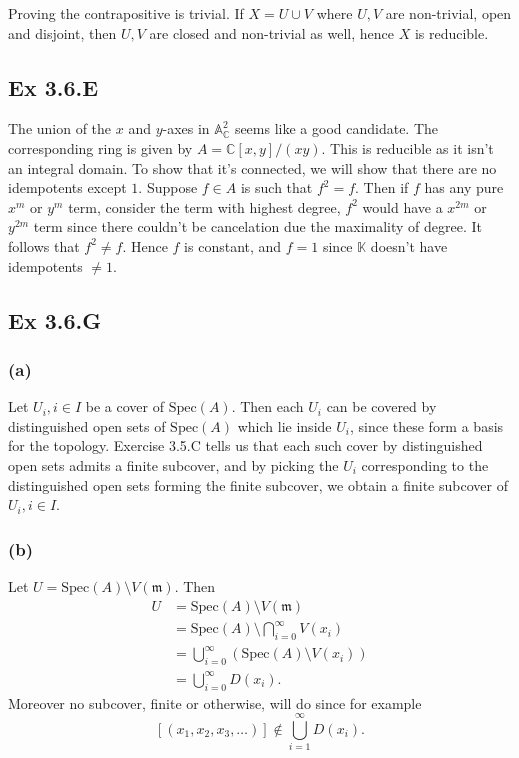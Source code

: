 \documentclass{article}
\theoremstyle{definition}
\newcommand{\C}{\mathbb{C}}
\newcommand{\K}{\mathbb{K}}
\newcommand{\A}{\mathbb{A}}
\newcommand{\Spec}{\text{Spec}}
\begin{document}
Proving the contrapositive is trivial. If $X = U \cup V$ where $U, V$ are
non-trivial, open and disjoint, then $U, V$ are closed and non-trivial as well,
hence $X$ is reducible.

\subsection*{Ex 3.6.E}

The union of the $x$ and $y$-axes in $\A^2_{\C}$ seems like a good candidate.
The corresponding ring is given by $A = \C[x, y]/(xy)$. This is reducible as it
isn't an integral domain. To show that it's connected, we will show that there
are no idempotents except $1$. Suppose $f \in A$ is such that $f^2 = f$. Then
if $f$ has any pure $x^m$ or $y^m$ term, consider the term with highest degree,
$f^2$ would have a $x^{2m}$ or $y^{2m}$ term since there couldn't be
cancelation due the maximality of degree. It follows that $f^2 \not = f$. Hence
$f$ is constant, and $f = 1$ since $\K$ doesn't have idempotents $\not = 1$.

\subsection*{Ex 3.6.G}

\subsubsection*{(a)}

Let $U_i, i \in I$ be a cover of $\Spec(A)$. Then each $U_i$ can be covered by
distinguished open sets of $\Spec(A)$ which lie inside $U_i$, since these form
a basis for the topology. Exercise 3.5.C tells us that each such cover by
distinguished open sets admits a finite subcover, and by picking the $U_i$
corresponding to the distinguished open sets forming the finite subcover, we
obtain a finite subcover of $U_i, i \in I$.

\subsubsection*{(b)}

Let $U = \Spec(A) \setminus V(\mathfrak{m})$. Then
\begin{align*}
	U
	 & =
	\Spec(A) \setminus V(\mathfrak{m})                              \\
	 & =
	\Spec(A) \setminus \bigcap_{i = 0}^{\infty} V(x_i)              \\
	 & =
	\bigcup_{i = 0}^{\infty} \left(\Spec(A) \setminus V(x_i)\right) \\
	 & =
	\bigcup_{i = 0}^{\infty} D(x_i).
\end{align*}
Moreover no subcover, finite or otherwise, will do since for example
\[
	[(x_1, x_2, x_3, \ldots)]
	\not \in
	\bigcup_{i = 1}^{\infty} D(x_i).
\]
\end{document}
